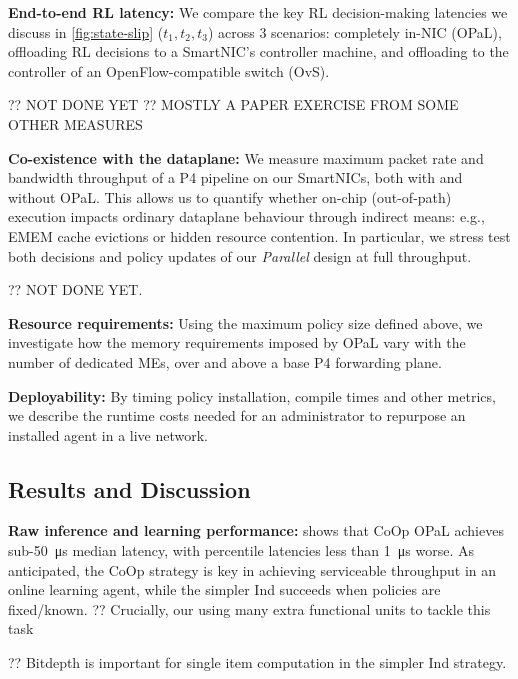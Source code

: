 \documentclass[sigconf,natbib=false]{acmart}
\newcommand{\fakepara}[1]{\noindent\textbf{#1:}}
\newcommand{\approachshort}{OPaL}
\newcommand{\Coopfw}{CoOp}
\newcommand{\Indfw}{Ind}
\begin{document}
\fakepara{End-to-end RL latency}
We compare the key RL decision-making latencies we discuss in \cref{fig:state-slip} ($t_1,t_2,t_3$) across 3 scenarios: completely in-NIC (\approachshort{}), offloading RL decisions to a SmartNIC's controller machine, and offloading to the controller of an OpenFlow-compatible switch (OvS).

?? NOT DONE YET
?? MOSTLY A PAPER EXERCISE FROM SOME OTHER MEASURES

\fakepara{Co-existence with the dataplane}
We measure maximum packet rate and bandwidth throughput of a P4 pipeline on our SmartNICs, both with and without \approachshort{}.
This allows us to quantify whether on-chip (out-of-path) execution impacts ordinary dataplane behaviour through indirect means: e.g., EMEM cache evictions or hidden resource contention.
In particular, we stress test both decisions and policy updates of our \emph{Parallel} design at full throughput.

?? NOT DONE YET.

\fakepara{Resource requirements}
Using the maximum policy size defined above, we investigate how the memory requirements imposed by \approachshort{} vary with the number of dedicated MEs, over and above a base P4 forwarding plane.


\fakepara{Deployability}
By timing policy installation, compile times and other metrics, we describe the runtime costs needed for an administrator to repurpose an installed agent in a live network.

\subsection{Results and Discussion}\label{sec:results}
\fakepara{Raw inference and learning performance}
 shows that \Coopfw{} \approachshort{} achieves sub-\SI{50}{\micro\second} median latency, with  percentile latencies less than \SI{1}{\micro\second} worse.
As anticipated, the \Coopfw{} strategy is key in achieving serviceable throughput in an online learning agent, while the simpler \Indfw{} succeeds when policies are fixed/known.
?? Crucially, our using many extra functional units to tackle this task

?? Bitdepth is important for single item computation in the simpler \Indfw{} strategy.
\end{document}
